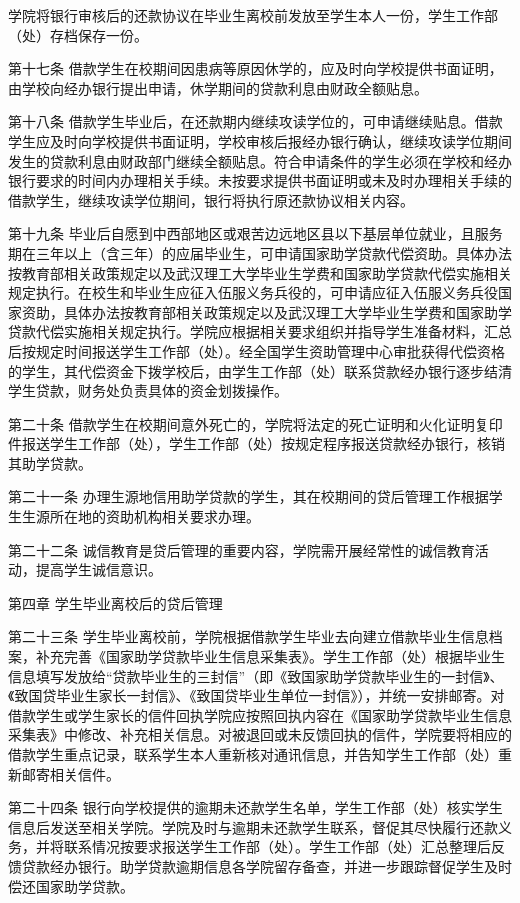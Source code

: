 \documentclass[UTF8,12pt,a4paper]{report}
\begin{document}
学院将银行审核后的还款协议在毕业生离校前发放至学生本人一份，学生工作部（处）存档保存一份。

第十七条 借款学生在校期间因患病等原因休学的，应及时向学校提供书面证明，由学校向经办银行提出申请，休学期间的贷款利息由财政全额贴息。

第十八条 借款学生毕业后，在还款期内继续攻读学位的，可申请继续贴息。借款学生应及时向学校提供书面证明，学校审核后报经办银行确认，继续攻读学位期间发生的贷款利息由财政部门继续全额贴息。符合申请条件的学生必须在学校和经办银行要求的时间内办理相关手续。未按要求提供书面证明或未及时办理相关手续的借款学生，继续攻读学位期间，银行将执行原还款协议相关内容。

第十九条 毕业后自愿到中西部地区或艰苦边远地区县以下基层单位就业，且服务期在三年以上（含三年）的应届毕业生，可申请国家助学贷款代偿资助。具体办法按教育部相关政策规定以及武汉理工大学毕业生学费和国家助学贷款代偿实施相关规定执行。在校生和毕业生应征入伍服义务兵役的，可申请应征入伍服义务兵役国家资助，具体办法按教育部相关政策规定以及武汉理工大学毕业生学费和国家助学贷款代偿实施相关规定执行。学院应根据相关要求组织并指导学生准备材料，汇总后按规定时间报送学生工作部（处）。经全国学生资助管理中心审批获得代偿资格的学生，其代偿资金下拨学校后，由学生工作部（处）联系贷款经办银行逐步结清学生贷款，财务处负责具体的资金划拨操作。

第二十条 借款学生在校期间意外死亡的，学院将法定的死亡证明和火化证明复印件报送学生工作部（处），学生工作部（处）按规定程序报送贷款经办银行，核销其助学贷款。

第二十一条 办理生源地信用助学贷款的学生，其在校期间的贷后管理工作根据学生生源所在地的资助机构相关要求办理。

第二十二条 诚信教育是贷后管理的重要内容，学院需开展经常性的诚信教育活动，提高学生诚信意识。

第四章 学生毕业离校后的贷后管理

第二十三条 学生毕业离校前，学院根据借款学生毕业去向建立借款毕业生信息档案，补充完善《国家助学贷款毕业生信息采集表》。学生工作部（处）根据毕业生信息填写发放给“贷款毕业生的三封信”（即《致国家助学贷款毕业生的一封信》、《致国贷毕业生家长一封信》、《致国贷毕业生单位一封信》），并统一安排邮寄。对借款学生或学生家长的信件回执学院应按照回执内容在《国家助学贷款毕业生信息采集表》中修改、补充相关信息。对被退回或未反馈回执的信件，学院要将相应的借款学生重点记录，联系学生本人重新核对通讯信息，并告知学生工作部（处）重新邮寄相关信件。

第二十四条 银行向学校提供的逾期未还款学生名单，学生工作部（处）核实学生信息后发送至相关学院。学院及时与逾期未还款学生联系，督促其尽快履行还款义务，并将联系情况按要求报送学生工作部（处）。学生工作部（处）汇总整理后反馈贷款经办银行。助学贷款逾期信息各学院留存备查，并进一步跟踪督促学生及时偿还国家助学贷款。
\end{document}
